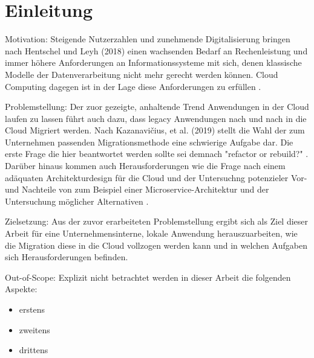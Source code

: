 
\chapter{Einleitung}


Motivation:
Steigende Nutzerzahlen und zunehmende Digitalisierung bringen nach Hentschel und Leyh (2018) einen wachsenden Bedarf an
Rechenleistung und immer höhere Anforderungen an Informationssysteme mit sich, denen klassische Modelle der Datenverarbeitung
nicht mehr gerecht werden können. Cloud Computing dagegen ist in der Lage diese Anforderungen zu erfüllen
\cite[Vgl.][S. 6]{Reinheimer2018}.

Problemstellung:
Der zuor gezeigte, anhaltende Trend Anwendungen in der Cloud laufen zu lassen führt auch dazu,
dass legacy Anwendungen nach und nach in die Cloud Migriert werden.
Nach Kazanavičius, et al. (2019) stellt die Wahl der zum Unternehmen passenden Migrationsmethode
eine schwierige Aufgabe dar. Die erste Frage die hier beantwortet werden sollte sei demnach
"refactor or rebuild?" \cite[Vgl.][S. 4]{Kazanavicius2019}.
Darüber hinaus kommen auch Herausforderungen wie die Frage nach einem adäquaten Architekturdesign
für die Cloud \cite[Vgl.][S. 14]{Pahl} und der Untersuchng potenzieler Vor- und Nachteile
von zum Beispiel einer Microservice-Architektur und der Untersuchung möglicher Alternativen
\cite[Vgl.][S. 3]{Carrasco2018}.

Zielsetzung:
Aus der zuvor erarbeiteten Problemstellung ergibt sich als Ziel dieser Arbeit für
eine Unternehmensinterne, lokale Anwendung herauszuarbeiten, wie die Migration diese in die
Cloud vollzogen werden kann und in welchen Aufgaben sich Herausforderungen befinden.

Out-of-Scope:
Explizit nicht betrachtet werden in dieser Arbeit die folgenden Aspekte:
\begin{itemize}
\item erstens
\item zweitens
\item drittens
\end{itemize}

\pagebreak



